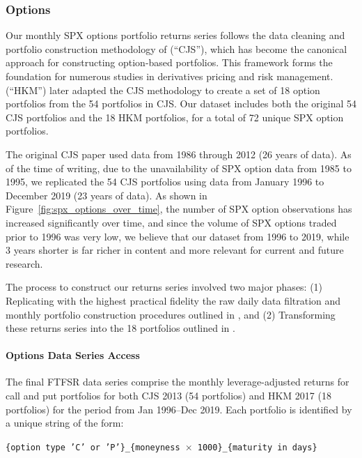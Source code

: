 \documentclass{article}
\begin{document}
\begin{appendices}
\subsubsection{Options}
\label{sec:options}

Our monthly SPX options portfolio returns series follows the data cleaning and portfolio construction methodology of \citet{Constantinides2013} (``CJS''), which has become the canonical approach for constructing option-based portfolios. This framework forms the foundation for numerous studies in derivatives pricing and risk management. \citet{He2017} (``HKM'') later adapted the CJS methodology to create a set of 18 option portfolios from the 54 portfolios in CJS. Our dataset includes both the original 54 CJS portfolios and the 18 HKM portfolios, for a total of 72 unique SPX option portfolios.

The original CJS paper used data from 1986 through 2012 (26 years of data). As of the time of writing, due to the unavailability of SPX option data from 1985 to 1995, we replicated the 54 CJS portfolios using data from January 1996 to December 2019 (23 years of data). As shown in Figure~\ref{fig:spx_options_over_time}, the number of SPX option observations has increased significantly over time, and since the volume of SPX options traded prior to 1996 was very low, we believe that our dataset from 1996 to 2019, while 3 years shorter is far richer in content and more relevant for current and future research.

The process to construct our returns series involved two major phases: (1) Replicating with the highest practical fidelity the raw daily data filtration and monthly portfolio construction procedures outlined in \citet{Constantinides2013}, and (2) Transforming these returns series into the 18 portfolios outlined in \citet{He2017}.

\paragraph{Options Data Series Access}

The final FTFSR data series comprise the monthly leverage-adjusted returns for call and put portfolios for both CJS 2013 (54 portfolios) and HKM 2017 (18 portfolios) for the period from Jan 1996--Dec 2019. Each portfolio is identified by a unique string of the form: 

\begin{center}
{\texttt{\{option type 'C' or 'P'\}\_\{moneyness $\times$ 1000\}\_\{maturity in days\}}}
\end{center}


\end{appendices}
\end{document}
